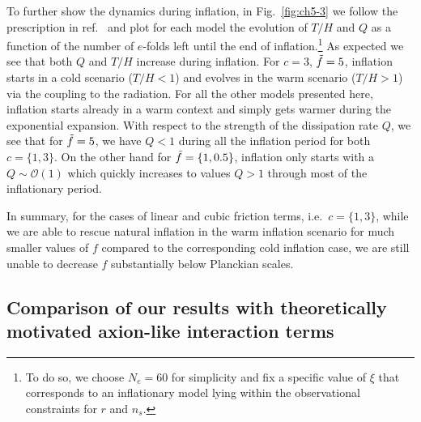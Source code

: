 To further show the dynamics during inflation, in Fig.~\ref{fig:ch5-3} we follow the prescription in ref.~\cite{Reyimuaji:2020bkm} and plot for each model the evolution of $T/H$ and $Q$ as a function of the number of $e$-folds left until the end of inflation.\footnote{To do so, we choose $N_e=60$ for simplicity and fix a specific value of $\xi$ that corresponds to an inflationary model lying within the observational constraints for $r$ and $n_s$.} As expected we see that both $Q$ and $T/H$ increase during inflation. For $c=3$, $\Tilde{f}=5$, inflation starts in a cold scenario ($T/H<1$) and evolves in the warm scenario ($T/H>1$) via the coupling to the radiation. For all the other models presented here, inflation starts already in a warm context and simply gets warmer during the exponential expansion. With respect to the strength of the dissipation rate $Q$, we see that for $\Tilde{f}=5$, we have $Q<1$ during all the inflation period for both $c=\{1,3\}$. On the other hand for $\Tilde{f}=\{1,0.5\}$, inflation only starts with a $Q\sim \mathcal{O}(1)$ which quickly increases to values $Q>1$ through most of the inflationary period.

In summary, for the cases of linear and cubic friction terms, i.e.\ $c=\{1,3\}$, while we are able to rescue natural inflation in the warm inflation scenario for much smaller values of $f$ compared to the corresponding cold inflation case, we are still unable to decrease $f$ substantially below Planckian scales.

\subsection{Comparison of our results with theoretically motivated axion-like interaction terms
}\label{sec:ch5-4.2}

